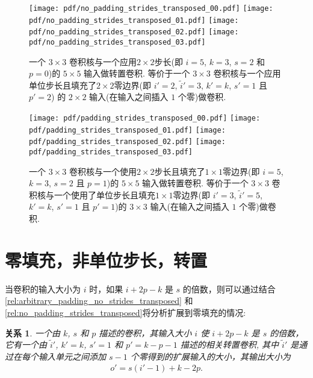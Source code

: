 \documentclass[notitlepage]{ctexrep}
\newtheorem{relationship}{关系}
\begin{document}
\begin{figure}[p]
    \centering
    \texttt{[image: pdf/no\_padding\_strides\_transposed\_00.pdf]}
    \texttt{[image: pdf/no\_padding\_strides\_transposed\_01.pdf]}
    \texttt{[image: pdf/no\_padding\_strides\_transposed\_02.pdf]}
    \texttt{[image: pdf/no\_padding\_strides\_transposed\_03.pdf]}
    \caption{\label{fig:no_padding_strides_transposed} 
    一个 $3 \times 3$ 卷积核与一个应用$2 \times 2$步长(即 $i = 5$, $k = 3$, $s = 2$ 和 $p = 0$)的 $5 \times 5$ 输入做转置卷积. 等价于一个 $3 \times 3$ 卷积核与一个应用单位步长且填充了$2 \times 2$零边界(即 $i' = 2$, $\tilde{i}' = 3$, $k' = k$, $s' = 1$ 且 $p' = 2$) 的 $2 \times 2$ 输入(在输入之间插入 $1$ 个零)做卷积.}
\end{figure}

\begin{figure}[p]
    \centering
    \texttt{[image: pdf/padding\_strides\_transposed\_00.pdf]}
    \texttt{[image: pdf/padding\_strides\_transposed\_01.pdf]}
    \texttt{[image: pdf/padding\_strides\_transposed\_02.pdf]}
    \texttt{[image: pdf/padding\_strides\_transposed\_03.pdf]}
    \caption{\label{fig:padding_strides_transposed} 
    一个 $3 \times 3$ 卷积核与一个使用$2 \times 2$步长且填充了$1 \times 1$零边界(即 $i = 5$, $k = 3$, $s = 2$ 且 $p = 1$)的 $5 \times 5$ 输入做转置卷积. 等价于一个 $3 \times 3$ 卷积核与一个使用了单位步长且填充$1 \times 1$零边界(即 $i' = 3$, $\tilde{i}' = 5$, $k' = k$, $s' = 1$ 且 $p' = 1$)的 $3 \times 3$ 输入(在输入之间插入 $1$ 个零)做卷积.}
\end{figure}

\section{零填充，非单位步长，转置} 

当卷积的输入大小为 $i$ 时，如果 $i + 2p - k$ 是 $s$ 的倍数，则可以通过结合
\autoref{rel:arbitrary_padding_no_strides_transposed} 和
\autoref{rel:no_padding_strides_transposed}将分析扩展到零填充的情况:

\begin{relationship}\label{rel:padding_strides_transposed}
一个由 $k$, $s$ 和 $p$ 描述的卷积，其输入大小 $i$ 使 $i + 2p - k$ 是 $s$ 的倍数，它有一个由 $\tilde{i}'$, $k' = k$, $s' = 1$ 和 $p' = k - p - 1$ 描述的相关转置卷积, 其中 $\tilde{i}'$ 是通过在每个输入单元之间添加 $s - 1$ 个零得到的扩展输入的大小，其输出大小为
\begin{equation*}
\begin{split}
    o' = s (i' - 1) + k - 2p.
\end{split}
\end{equation*}
\end{relationship}
\end{document}
